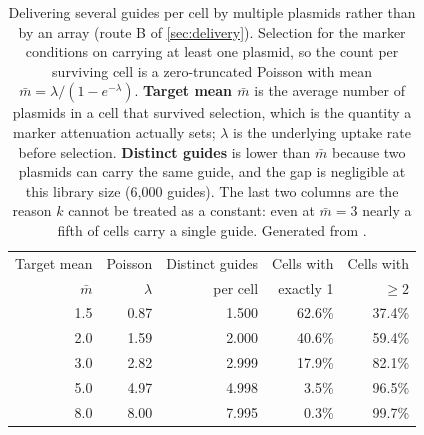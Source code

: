 \begin{table}[htbp]\centering
\footnotesize
\caption[]{Delivering several guides per cell by multiple plasmids rather than by an array (route B of \cref{sec:delivery}). Selection for the marker conditions on carrying at least one plasmid, so the count per surviving cell is a zero-truncated Poisson with mean $\bar m = \lambda/(1-e^{-\lambda})$. \textbf{Target mean $\bar m$} is the average number of plasmids in a cell that survived selection, which is the quantity a marker attenuation actually sets; $\lambda$ is the underlying uptake rate before selection. \textbf{Distinct guides} is lower than $\bar m$ because two plasmids can carry the same guide, and the gap is negligible at this library size (6{,}000 guides). The last two columns are the reason $k$ cannot be treated as a constant: even at $\bar m = 3$ nearly a fifth of cells carry a single guide. Generated from .}\label{tab:delivery}
\begin{tabular}{rrrrr}
\toprule
Target mean & Poisson & Distinct guides & Cells with & Cells with \\
$\bar m$ & $\lambda$ & per cell & exactly 1 & $\ge 2$ \\
\midrule
1.5 & 0.87 & 1.500 & 62.6\% & 37.4\% \\
2.0 & 1.59 & 2.000 & 40.6\% & 59.4\% \\
3.0 & 2.82 & 2.999 & 17.9\% & 82.1\% \\
5.0 & 4.97 & 4.998 & 3.5\% & 96.5\% \\
8.0 & 8.00 & 7.995 & 0.3\% & 99.7\% \\
\bottomrule
\end{tabular}
\end{table}
